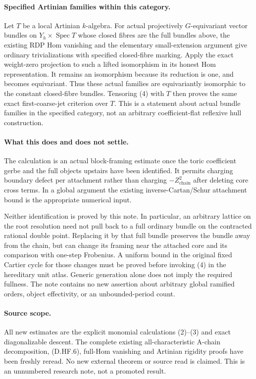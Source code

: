 \paragraph{Specified Artinian families within this category.}
Let $T$ be a local Artinian $k$-algebra. For actual projectively
$G$-equivariant vector bundles on $Y_h\times\operatorname{Spec}T$ whose
closed fibres are the full bundles above, the existing RDP Hom vanishing
and the elementary small-extension argument give ordinary
trivializations with specified closed-fibre marking. Apply the exact
weight-zero projection to such a lifted isomorphism in its honest Hom
representation. It remains an isomorphism because its reduction is one,
and becomes equivariant. Thus these actual families are equivariantly
isomorphic to the constant closed-fibre bundles. Tensoring (4) with $T$
then proves the same exact first-coarse-jet criterion over $T$.
This is a statement about actual bundle families in the specified
category, not an arbitrary coefficient-flat reflexive hull construction.

\paragraph{What this does and does not settle.}
The calculation is an actual block-framing estimate once the toric
coefficient gerbe and the full objects upstairs have been identified.
It permits charging boundary defect per attachment rather than charging
$-Z_{\mathrm{chain}}^2$ after deleting core cross terms. In a global
argument the existing inverse-Cartan/Schur attachment bound is the
appropriate numerical input.

Neither identification is proved by this note. In particular, an
arbitrary lattice on the root resolution need not pull back to a full
ordinary bundle on the contracted rational double point. Replacing it
by that full bundle preserves the bundle away from the chain, but can
change its framing near the attached core and its comparison with
one-step Frobenius. A uniform bound in the original fixed Cartier cycle
for those changes must be proved before invoking (4) in the hereditary
unit atlas. Generic generation alone does not imply the required
fullness. The note contains no new assertion about arbitrary global
ramified orders, object effectivity, or an unbounded-period count.

\paragraph{Source scope.}
All new estimates are the explicit monomial calculations (2)--(3) and
exact diagonalizable descent. The complete existing all-characteristic
A-chain decomposition, (D.HF.6), full-Hom vanishing and Artinian rigidity
proofs have been freshly reread. No new external theorem or source read
is claimed. This is an unnumbered research note, not a promoted result.
